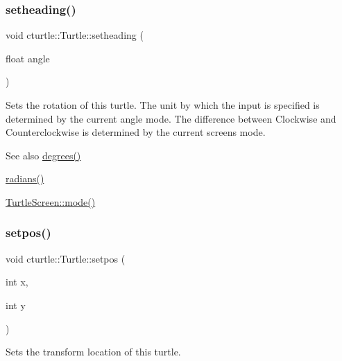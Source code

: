 \subsubsection{\texorpdfstring{setheading()}{setheading()}}
{\footnotesize\ttfamily void cturtle\+::\+Turtle\+::setheading (\begin{DoxyParamCaption}\item[{float}]{angle }\end{DoxyParamCaption})}



Sets the rotation of this turtle. The unit by which the input is specified is determined by the current angle mode. The difference between Clockwise and Counterclockwise is determined by the current screen\textquotesingle{}s mode. 

\begin{DoxySeeAlso}{See also}
\hyperlink{classcturtle_1_1Turtle_aa68704b24017c6a8cda41ff292ecafde}{degrees()} 

\hyperlink{classcturtle_1_1Turtle_a9c266e318f05dc5d45ddbeb830a373fa}{radians()} 

\hyperlink{classcturtle_1_1InteractiveTurtleScreen_a1c666afe65211cf9eedaffa17206a697}{Turtle\+Screen\+::mode()} 
\end{DoxySeeAlso}
\mbox{\label{classcturtle_1_1Turtle_ab7e2193a04b72e94069fcccd85fa40db}} 
\subsubsection{\texorpdfstring{setpos()}{setpos()}\hspace{0.1cm}{\footnotesize\ttfamily [1/2]}}
{\footnotesize\ttfamily void cturtle\+::\+Turtle\+::setpos (\begin{DoxyParamCaption}\item[{int}]{x,  }\item[{int}]{y }\end{DoxyParamCaption})\hspace{0.3cm}{\ttfamily [inline]}}



Sets the transform location of this turtle. 

\mbox{\label{classcturtle_1_1Turtle_a72b2958266efc5b3aea86a459bd04d0b}} 

